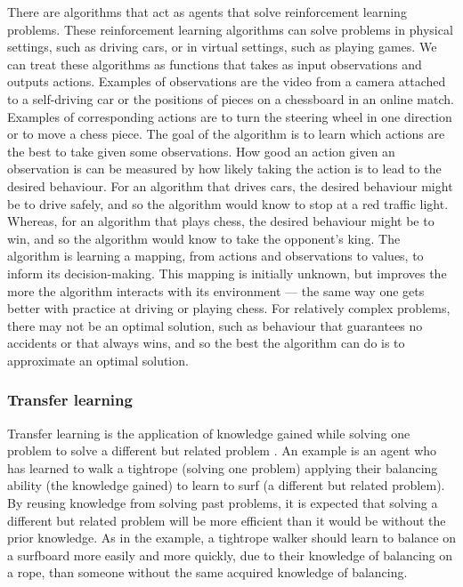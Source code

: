\documentclass[12pt,a4paper]{article}
\begin{document}
There are algorithms that act as agents that solve reinforcement learning problems. These reinforcement learning algorithms can solve problems in physical settings, such as driving cars, or in virtual settings, such as playing games. We can treat these algorithms as functions that takes as input observations and outputs actions. Examples of observations are the video from a camera attached to a self-driving car or the positions of pieces on a chessboard in an online match. Examples of corresponding actions are to turn the steering wheel in one direction or to move a chess piece. The goal of the algorithm is to learn which actions are the best to take given some observations. How good an action given an observation is can be measured by how likely taking the action is to lead to the desired behaviour. For an algorithm that drives cars, the desired behaviour might be to drive safely, and so the algorithm would know to stop at a red traffic light. Whereas, for an algorithm that plays chess, the desired behaviour might be to win, and so the algorithm would know to take the opponent's king. The algorithm is learning a mapping, from actions and observations to values, to inform its decision-making. This mapping is initially unknown, but improves the more the algorithm interacts with its environment --- the same way one gets better with practice at driving or playing chess. For relatively complex problems, there may not be an optimal solution, such as behaviour that guarantees no accidents or that always wins, and so the best the algorithm can do is to approximate an optimal solution. 

\subsubsection{Transfer learning}
Transfer learning is the application of knowledge gained while solving one problem to solve a different but related problem \cite{2010}. An example is an agent who has learned to walk a tightrope (solving one problem) applying their balancing ability (the knowledge gained) to learn to surf (a different but related problem). By reusing knowledge from solving past problems, it is expected that solving a different but related problem will be more efficient than it would be without the prior knowledge. As in the example, a tightrope walker should learn to balance on a surfboard more easily and more quickly, due to their knowledge of balancing on a rope, than someone without the same acquired knowledge of balancing. 
\end{document}
